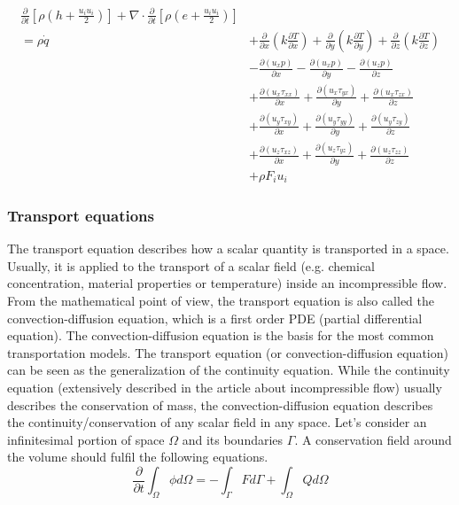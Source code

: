 \documentclass{article}
\begin{document}
\begin{align*}
 \frac{\partial}{\partial t}\left[ \rho\left( h +\frac{u_i u_i}{2}\right) \right] + \nabla \cdot \frac{\partial}{\partial t}\left[ \rho\left( e +\frac{u_i u_i}{2} \right) \right]\\
 = \rho \dot{q} &+ \frac{\partial}{\partial x}\left(k \frac{\partial T}{\partial x}\right) + \frac{\partial}{\partial y}\left(k \frac{\partial T}{\partial y}\right) + \frac{\partial}{\partial z}\left(k \frac{\partial T}{\partial z}\right)\\
 &- \frac{\partial(u_xp)}{\partial x} - \frac{\partial(u_xp)}{\partial y} - \frac{\partial(u_zp)}{\partial z} \\
 &+ \frac{\partial(u_x \tau_{xx})}{\partial x} + \frac{\partial(u_x \tau_{yx})}{\partial y} +\frac{\partial(u_x \tau_{zx})}{\partial z} \\
 &+ \frac{\partial(u_y \tau_{xy})}{\partial x} + \frac{\partial(u_y \tau_{yy})}{\partial y} +\frac{\partial(u_y \tau_{zy})}{\partial z} \\
 &+ \frac{\partial(u_z \tau_{xz})}{\partial x} + \frac{\partial(u_z \tau_{yz})}{\partial y} +\frac{\partial(u_z \tau_{zz})}{\partial z} \\
 &+ \rho F_i u_i
\end{align*}

\subsubsection{Transport equations}
The transport equation describes how a scalar quantity is transported in a space. Usually, it is applied to the transport of a scalar field (e.g. chemical concentration, material properties or temperature) inside an incompressible flow. From the mathematical point of view, the transport equation is also called the convection-diffusion equation, which is a first order PDE (partial differential equation). The convection-diffusion equation is the basis for the most common transportation models. The transport equation (or convection-diffusion equation) can be seen as the generalization of the continuity equation. While the continuity equation (extensively described in the article about incompressible flow) usually describes the conservation of mass, the convection-diffusion equation describes the continuity/conservation of any scalar field in any space. Let’s consider an infinitesimal portion of space $\Omega$ and its boundaries $\Gamma$. A conservation field around the volume should fulfil the following equations.
\begin{equation}
\frac{\partial}{\partial t}\int_\Omega \phi d\Omega =  -\int_\Gamma Fd\Gamma + \int_\Omega Q d \Omega
\end{equation}
\end{document}
